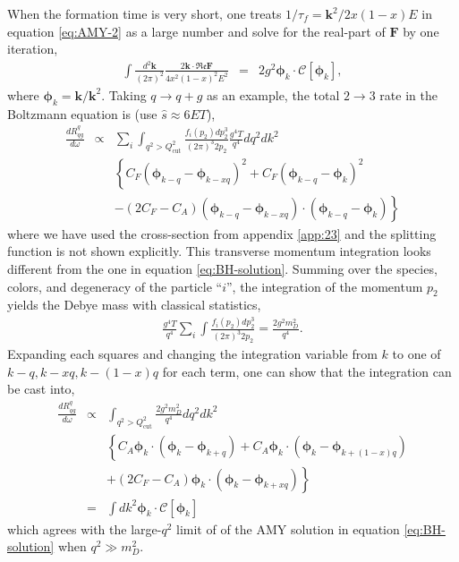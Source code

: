 \documentclass[aps, prc, reprint, amsmath, groupedaddress, nofootinbib]{revtex4-1}
\begin{document}
When the formation time is very short, one treats $1/\tau_f = \mathbf{k}^2/2x(1-x)E$ in equation \ref{eq:AMY-2} as a large number and solve for the real-part of $\mathbf{F}$ by one iteration,
\begin{eqnarray}
\int\frac{d^2\mathbf{k}}{(2\pi)^2} \frac{2\mathbf{k}\cdot \mathfrak{Re} \mathbf{F}}{4x^2(1-x)^2E^2} &=& 2g^2 \mathbf{\phi}_k\cdot \mathcal{C}[\mathbf{\phi}_k] \label{eq:BH-solution},
\end{eqnarray}
where $\mathbf{\phi}_k = \mathbf{k}/\mathbf{k}^2$.
Taking $q\rightarrow q+g$ as an example, the total $2\rightarrow 3$ rate in the Boltzmann equation is (use $\hat{s} \approx 6 ET$),
\begin{eqnarray}
\frac{dR^{q}_{qg}}{d\omega} &\propto&  \sum_i\int_{q^2 > Q_{\textrm{cut}}^2}   \frac{f_i(p_2)dp_2^3}{(2\pi)^3 2p_2}  \frac{g^4 T}{q^4} dq^2 d k^2\\\nonumber
&& \left\{
C_F\left( \mathbf{\phi}_{k-q}-\mathbf{\phi}_{k-xq} \right)^2
+ C_F\left( \mathbf{\phi}_{k-q}-\mathbf{\phi}_{k} \right)^2\right.\\\nonumber
&&\left.
- (2C_F-C_A)\left( \mathbf{\phi}_{k-q}-\mathbf{\phi}_{k-xq} \right)\cdot \left( \mathbf{\phi}_{k-q}-\mathbf{\phi}_{k} \right)
\right\}
\end{eqnarray}
where we have used the cross-section from appendix \ref{app:23} and the splitting function is not shown explicitly.
This transverse momentum integration looks different from the one in equation \ref{eq:BH-solution}.
Summing over the species, colors, and degeneracy of the particle ``$i$'', the integration of the momentum $p_2$ yields the Debye mass with classical statistics,
\begin{eqnarray}
\frac{g^4 T}{q^4}\sum_i\int \frac{f_i(p_2)dp_2^3}{(2\pi)^3 2p_2} = \frac{2g^2 m_D^2}{q^4}.
\end{eqnarray}
Expanding each squares and changing the integration variable from $k$ to one of $k-q, k-xq, k-(1-x)q$ for each term, one can show that the integration can be cast into,
\begin{eqnarray}
\frac{dR^{q}_{qg}}{d\omega} &\propto& \int_{q^2 > Q_{\textrm{cut}}^2}  \frac{2g^2 m_D^2}{q^4} d q^2 dk^2\\\nonumber
&& \left\{
C_A\mathbf{\phi}_{k}\cdot \left( \mathbf{\phi}_{k}-\mathbf{\phi}_{k+q} \right)
+C_A\mathbf{\phi}_{k} \cdot \left( \mathbf{\phi}_k - \mathbf{\phi}_{k+(1-x)q}\right) \right.\\\nonumber
&&\left.+(2C_F-C_A)\mathbf{\phi}_{k} \cdot \left(\mathbf{\phi}_k-\mathbf{\phi}_{k+xq} \right)
\right\} \\
&=&  \int dk^2 \mathbf{\phi}_k \cdot \mathcal{C}[\mathbf{\phi}_k]
\end{eqnarray}
which agrees with the large-$q^2$ limit of of the AMY solution in equation \ref{eq:BH-solution} when $q^2 \gg m_D^2$.
\end{document}
